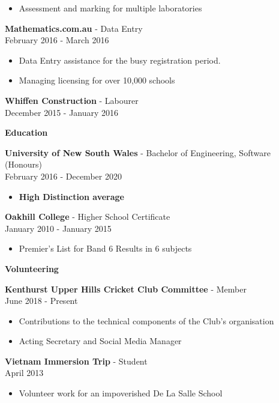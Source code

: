 \documentclass[a4paper]{article}
\newcommand{\minititle}[1]{{\Large \begin{center} \textbf{#1} \end{center}} \vspace{0.2cm}}
\newcommand{\resumeEntry}[3]{{\large \textbf{#1} - #2} \\ \small{#3} }
\begin{document}
\begin{minipage}[t]{0.7\linewidth}
{\begin{itemize}
            \item Assessment and marking for multiple laboratories
        \end{itemize}
        \vspace{0.3cm}
        \resumeEntry{Mathematics.com.au}{Data Entry}{February 2016 - March 2016}
        \begin{itemize}
            \setlength\itemsep{0.03cm}
            \item Data Entry assistance for the busy registration period.
            \item Managing licensing for over 10,000 schools
        \end{itemize}
        \vspace{0.3cm}
        \resumeEntry{Whiffen Construction}{Labourer}{December 2015 - January 2016}
    }
    {
        \vspace{0.1cm}
        \minititle{Education}
        \resumeEntry{University of New South Wales}{Bachelor of Engineering, Software (Honours)}{February 2016 - December 2020}
        \begin{itemize}
            \setlength\itemsep{0.03cm}
            \item \textbf{High Distinction average}
        \end{itemize}
        \vspace{0.4cm}
        \resumeEntry{Oakhill College}{Higher School Certificate}{January 2010 - January 2015}
        \begin{itemize}
            \setlength\itemsep{0.03cm}
            \item {Premier's List for Band 6 Results in 6 subjects}
        \end{itemize}
    }
    {
        \minititle{Volunteering}
        \resumeEntry{Kenthurst Upper Hills Cricket Club Committee}{Member}{June 2018 - Present}
        \begin{itemize}
            \setlength\itemsep{0.03cm}
            \item Contributions to the technical components of the Club's organisation
            \item Acting Secretary and Social Media Manager
        \end{itemize}
        \vspace{0.4cm}
        \resumeEntry{Vietnam Immersion Trip}{Student}{April 2013}
        \begin{itemize}
            \setlength\itemsep{0.03cm}
            \item Volunteer work for an impoverished De La Salle School
        \end{itemize}
    }
\end{minipage}\hspace{0.8cm}
\end{document}
